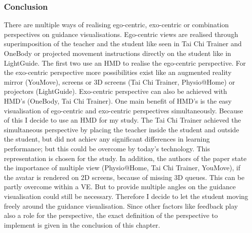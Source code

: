 \subsubsection{Conclusion}
There are multiple ways of realising ego-centric, exo-centric or combination perspectives on guidance visualisations. Ego-centric views are realised through superimposition of the teacher and the student like seen in Tai Chi Trainer and OneBody or projected movement instructions directly on the student like in LightGuide. The first two use an HMD to realise the ego-centric perspective. For the exo-centric perspective more possibilities exist like an augmented reality mirror (YouMove), screens or 3D screens (Tai Chi Trainer, Physio@Home) or projectors (LightGuide). Exo-centric perspective can also be achieved with HMD's (OneBody, Tai Chi Trainer). One main benefit of HMD's is the easy visualisation of ego-centric and exo-centric perspectives simultaneously. Because of this I decide to use an HMD for my study. The Tai Chi Trainer achieved the simultaneous perspective by placing the teacher inside the student and outside the student, but did not achiev any significant differences in learning performance; but this could be overcome by today's technology. This representation is chosen for the study. In addition, the authors of the paper state the importance of multiple view (Physio@Home, Tai Chi Trainer, YouMove), if the avatar is rendered on 2D screens, because of missing 3D queues. This can be partly overcome within a VE. But to provide multiple angles on the guidance visualisation could still be necessary. Therefore I decide to let the student moving freely around the guidance visualisation. Since other factors like feedback play also a role for the perspective, the exact definition of the perspective to implement is given in the conclusion of this chapter.



